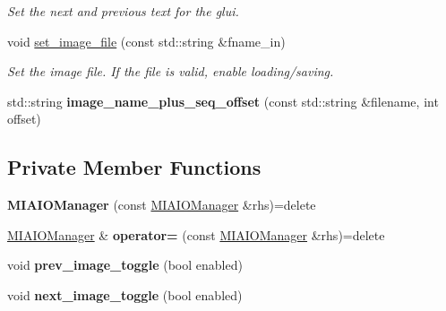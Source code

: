 \begin{DoxyCompactItemize}
\begin{DoxyCompactList}\small\item\em Set the next and previous text for the glui. \end{DoxyCompactList}\item 
void \hyperlink{classimage__tools_1_1MIAIOManager_a209180ddcfe3bf43d8fd7c6635391ea4}{set\+\_\+image\+\_\+file} (const std\+::string \&fname\+\_\+in)
\begin{DoxyCompactList}\small\item\em Set the image file. If the file is valid, enable loading/saving. \end{DoxyCompactList}\item 
std\+::string {\bfseries image\+\_\+name\+\_\+plus\+\_\+seq\+\_\+offset} (const std\+::string \&filename, int offset)\hypertarget{classimage__tools_1_1MIAIOManager_ada4fae71b72e3a28ba40ffbc24ef8683}{}\label{classimage__tools_1_1MIAIOManager_ada4fae71b72e3a28ba40ffbc24ef8683}

\end{DoxyCompactItemize}
\subsection*{Private Member Functions}
\begin{DoxyCompactItemize}
\item 
{\bfseries M\+I\+A\+I\+O\+Manager} (const \hyperlink{classimage__tools_1_1MIAIOManager}{M\+I\+A\+I\+O\+Manager} \&rhs)=delete\hypertarget{classimage__tools_1_1MIAIOManager_a4705d1544a60d8275803487ec9b17be8}{}\label{classimage__tools_1_1MIAIOManager_a4705d1544a60d8275803487ec9b17be8}

\item 
\hyperlink{classimage__tools_1_1MIAIOManager}{M\+I\+A\+I\+O\+Manager} \& {\bfseries operator=} (const \hyperlink{classimage__tools_1_1MIAIOManager}{M\+I\+A\+I\+O\+Manager} \&rhs)=delete\hypertarget{classimage__tools_1_1MIAIOManager_a9ab2095006589dda25bbf2a8d1aca39e}{}\label{classimage__tools_1_1MIAIOManager_a9ab2095006589dda25bbf2a8d1aca39e}

\item 
void {\bfseries prev\+\_\+image\+\_\+toggle} (bool enabled)\hypertarget{classimage__tools_1_1MIAIOManager_a87cd4108946bdf57ad6f2eedd545e30c}{}\label{classimage__tools_1_1MIAIOManager_a87cd4108946bdf57ad6f2eedd545e30c}

\item 
void {\bfseries next\+\_\+image\+\_\+toggle} (bool enabled)\hypertarget{classimage__tools_1_1MIAIOManager_a2b1effd6e28593276280f8665cd6c6b3}{}\label{classimage__tools_1_1MIAIOManager_a2b1effd6e28593276280f8665cd6c6b3}

\end{DoxyCompactItemize}
